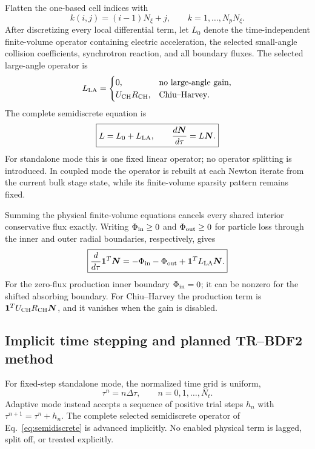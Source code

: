 \documentclass[11pt]{article}
\begin{document}
Flatten the one-based cell indices with
\begin{equation}
 k(i,j)=(i-1)N_\xi+j,
 \qquad k=1,\ldots,N_pN_\xi.
 \label{eq:flattening}
\end{equation}
After discretizing every local differential term, let $L_0$ denote the time-independent
finite-volume operator containing electric acceleration, the selected small-angle
collision coefficients, synchrotron reaction, and all boundary fluxes.  The selected
large-angle operator is
\begin{equation}
 L_{\rm LA}=\begin{cases}
 0, & \text{no large-angle gain},\\
 U_{\rm CH}R_{\rm CH}, & \text{Chiu--Harvey}.
 \end{cases}
 \label{eq:large_angle_discrete_choices}
\end{equation}
The complete semidiscrete equation is
\begin{equation}
 \boxed{
 L=L_0+L_{\rm LA},\qquad
 \frac{d\bm N}{d\tau}=L\bm N.
 }
 \label{eq:semidiscrete}
\end{equation}
For standalone mode this is one fixed linear operator; no operator splitting is
introduced.  In coupled mode the operator is rebuilt at each Newton iterate from
the current bulk stage state, while its finite-volume sparsity pattern remains fixed.

Summing the physical finite-volume equations cancels every shared interior conservative
flux exactly.  Writing $\Phi_{\rm in}\ge0$ and $\Phi_{\rm out}\ge0$ for particle loss
through the inner and outer radial boundaries, respectively, gives
\begin{equation}
 \boxed{
 \frac{d}{d\tau}\bm 1^T\bm N
 =-\Phi_{\rm in}-\Phi_{\rm out}+\bm 1^TL_{\rm LA}\bm N.
 }
 \label{eq:discrete_particle_balance}
\end{equation}
For the zero-flux production inner boundary $\Phi_{\rm in}=0$; it can be nonzero for the
shifted absorbing boundary.  For Chiu--Harvey the production term is
$\bm1^TU_{\rm CH}R_{\rm CH}\bm N$, and it vanishes when the gain is disabled.

\subsection{Implicit time stepping and planned TR--BDF2 method}

For fixed-step standalone mode, the normalized time grid is uniform,
\begin{equation}
 \tau^n=n\Delta\tau,\qquad n=0,1,\ldots,N_t.
 \label{eq:uniform_time_grid}
\end{equation}
Adaptive mode instead accepts a sequence of positive trial steps $h_n$ with
$\tau^{n+1}=\tau^n+h_n$.  The complete selected semidiscrete operator of
Eq.~\eqref{eq:semidiscrete} is advanced implicitly.  No enabled physical term is
lagged, split off, or treated explicitly.
\end{document}
